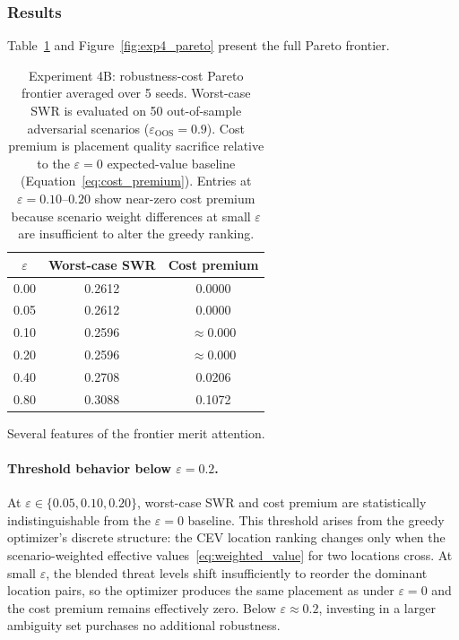 \documentclass[11pt]{article}
\begin{document}
\subsubsection{Results}

Table~\ref{tab:exp4_pareto} and Figure~\ref{fig:exp4_pareto} present
the full Pareto frontier.

\begin{table}[htbp]
\centering
\caption{Experiment 4B: robustness-cost Pareto frontier averaged over 5 seeds.
Worst-case SWR is evaluated on 50 out-of-sample adversarial scenarios
($\varepsilon_{\mathrm{OOS}} = 0.9$). Cost premium is placement quality
sacrifice relative to the $\varepsilon = 0$ expected-value baseline
(Equation~\eqref{eq:cost_premium}). Entries at $\varepsilon = 0.10$--$0.20$
show near-zero cost premium because scenario weight differences at small
$\varepsilon$ are insufficient to alter the greedy ranking.}
\label{tab:exp4_pareto}
\begin{tabular}{ccc}
\toprule
$\varepsilon$ & Worst-case SWR & Cost premium \\
\midrule
0.00 & 0.2612 & 0.0000 \\
0.05 & 0.2612 & 0.0000 \\
0.10 & 0.2596 & $\approx$0.000 \\
0.20 & 0.2596 & $\approx$0.000 \\
0.40 & 0.2708 & 0.0206 \\
0.80 & 0.3088 & 0.1072 \\
\bottomrule
\end{tabular}
\end{table}

Several features of the frontier merit attention.

\paragraph{Threshold behavior below $\varepsilon = 0.2$.}
At $\varepsilon \in \{0.05, 0.10, 0.20\}$, worst-case SWR and cost
premium are statistically indistinguishable from the $\varepsilon = 0$
baseline.  This threshold arises from the greedy optimizer's discrete
structure: the CEV location ranking changes only when the scenario-weighted
effective values~\eqref{eq:weighted_value} for two locations cross.
At small $\varepsilon$, the blended threat levels shift insufficiently
to reorder the dominant location pairs, so the optimizer produces the
same placement as under $\varepsilon = 0$ and the cost premium remains
effectively zero.  Below $\varepsilon \approx 0.2$, investing in a
larger ambiguity set purchases no additional robustness.
\end{document}
